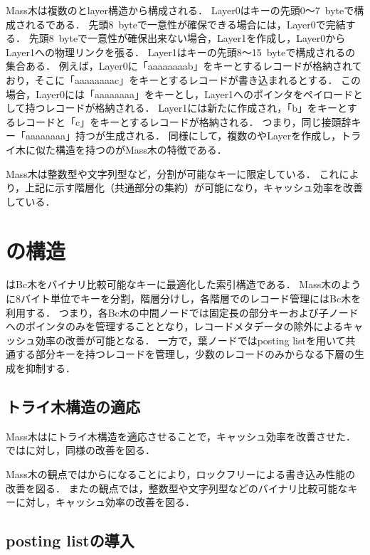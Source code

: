 Mass木は複数の\Bptree{}とlayer構造から構成される．
Layer0はキーの先頭0～7~byteで構成される\Bptree{}である．
先頭8~byteで一意性が確保できる場合には，Layer0で完結する．
先頭8~byteで一意性が確保出来ない場合，Layer1を作成し，Layer0からLayer1への物理リンクを張る．
Layer1はキーの先頭8～15~byteで構成される\Bptree{}の集合ある．
例えば，Layer0に「aaaaaaaab」をキーとするレコードが格納されており，そこに「aaaaaaaac」をキーとするレコードが書き込まれるとする．
この場合，Layer0には「aaaaaaaa」をキーとし，Layer1へのポインタをペイロードとして持つレコードが格納される．
Layer1には新たに\Bptree{}作成され，「b」をキーとするレコードと「c」をキーとするレコードが格納される．
つまり，同じ接頭辞キー「aaaaaaaa」持つ\Bptree{}が生成される．
同様にして，複数の\Bptree{}やLayerを作成し，トライ木に似た構造を持つのがMass木の特徴である．

Mass木は整数型や文字列型など，分割が可能なキーに限定している．
これにより，上記に示す階層化（共通部分の集約）が可能になり，キャッシュ効率を改善している．

\section{\Bcforest{}の構造}
\label{sec:bc_forest_structure}

\Bcforest{}はBc木をバイナリ比較可能なキーに最適化した索引構造である．
Mass木のように8バイト単位でキーを分割，階層分けし，各階層でのレコード管理にはBc木を利用する．
つまり，各Bc木の中間ノードでは固定長の部分キーおよび子ノードへのポインタのみを管理することとなり，レコードメタデータの除外によるキャッシュ効率の改善が可能となる．
一方で，葉ノードではposting listを用いて共通する部分キーを持つレコードを管理し，少数のレコードのみからなる下層の生成を抑制する．

\subsection{トライ木構造の適応}

Mass木は\Bptree{}にトライ木構造を適応させることで，キャッシュ効率を改善させた．
\Bcforest{}では\Bctree{}に対し，同様の改善を図る．

Mass木の観点では\Bptree{}から\Bctree{}になることにより，ロックフリーによる書き込み性能の改善を図る．
また\Bctree{}の観点では，整数型や文字列型などのバイナリ比較可能なキーに対し，キャッシュ効率の改善を図る．

\subsection{posting listの導入}

